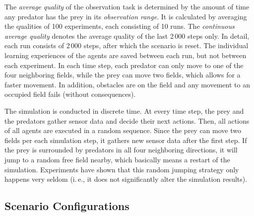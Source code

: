 \documentclass{sig-alternate}
\begin{document}
The \emph{average} \emph{quality} of the observation task is determined by the amount of time any predator has the prey in its \emph{observation range}. It is calculated by averaging the qualities of 100 experiments, each consisting of 10 runs. The \emph{continuous average quality} denotes the average quality of the last 2\,000 steps only. In detail, each run consists of 2\,000 steps, after which the scenario is reset. The individual learning experiences of the agents are saved between each run, but not between each experiment. In each time step, each predator can only move to one of the four neighboring fields, while the prey can move two fields, which allows for a faster movement. In addition, obstacles are on the field and any movement to an occupied field fails (without consequences). 

The simulation is conducted in discrete time. At every time step, the prey and the predators gather sensor data and decide their next actions. Then, all actions of all agents are executed in a random sequence. Since the prey can move two fields per each simulation step, it gathers new sensor data after the first step. If the prey is surrounded by predators in all four neighboring directions, it will jump to a random free field nearby, which basically means a restart of the simulation. Experiments have shown that this random jumping strategy only happens very seldom (i.\,e., it does not significantly alter the simulation results).

\subsection{Scenario Configurations}
\label{subsection:scenario-obstacle}
\end{document}
